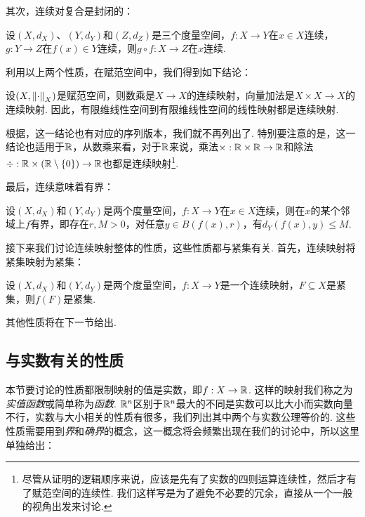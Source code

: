 其次，连续对复合是封闭的：
\begin{proposition}\label{prop:continuous-composition}
    设$(X,d_X)$、$(Y,d_Y)$和$(Z,d_Z)$是三个度量空间，$f:X\to Y$在$x\in X$连续，$g:Y\to Z$在$f(x)\in Y$连续，则$g\circ f:X\to Z$在$x$连续. 
\end{proposition}

利用以上两个性质，在赋范空间中，我们得到如下结论：
\begin{corollary}\label{cor:continuous-linear}
    设$(X,\left\|\cdot\right\|_X)$是赋范空间，则数乘是$X\to X$的连续映射，向量加法是$X\times X\to X$的连续映射. 因此，有限维线性空间到有限维线性空间的线性映射都是连续映射. 
\end{corollary}
根据，这一结论也有对应的序列版本，我们就不再列出了. 特别要注意的是，这一结论也适用于$\mathbb{R}$，从数乘来看，对于$\mathbb{R}$来说，乘法$\times:\mathbb{R}\times\mathbb{R}\to\mathbb{R}$和除法$\div:\mathbb{R}\times(\mathbb{R}\setminus\{0\})\to\mathbb{R}$也都是连续映射\footnote{尽管从证明的逻辑顺序来说，应该是先有了实数的四则运算连续性，然后才有了赋范空间的连续性. 我们这样写是为了避免不必要的冗余，直接从一个一般的视角出发来讨论. }. 

最后，连续意味着有界：
\begin{proposition}\label{prop:continuous-bounded}
    设$(X,d_X)$和$(Y,d_Y)$是两个度量空间，$f:X\to Y$在$x\in X$连续，则在$x$的某个邻域上$f$有界，即存在$r,M>0$，对任意$y\in B(f(x),r)$，有$d_Y(f(x),y)\leq M$. 
\end{proposition}

接下来我们讨论连续映射整体的性质，这些性质都与紧集有关. 首先，连续映射将紧集映射为紧集：

\begin{proposition}\label{prop:continuous-compact}
    设$(X,d_X)$和$(Y,d_Y)$是两个度量空间，$f:X\to Y$是一个连续映射，$F\subseteq X$是紧集，则$f(F)$是紧集. 
\end{proposition}

其他性质将在下一节给出. 

\subsection{与实数有关的性质}

本节要讨论的性质都限制映射的值是实数，即$f:X\to \mathbb{R}$. 这样的映射我们称之为\emph{实值函数}或简单称为\emph{函数}. $\mathbb{R}^n$区别于$\mathbb{R}^n$最大的不同是实数可以比大小而实数向量不行，实数与大小相关的性质有很多，我们列出其中两个与实数公理等价的. 这些性质需要用到\emph{界}和\emph{确界}的概念，这一概念将会频繁出现在我们的讨论中，所以这里单独给出：

